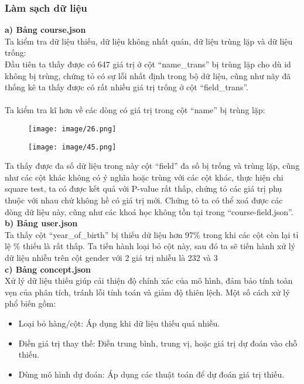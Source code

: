 \subsubsection{Làm sạch dữ liệu}
\textbf{a) Bảng course.json}\\
Ta kiểm tra dữ liệu thiếu, dữ liệu không nhất quán, dữ liệu trùng lặp và dữ liệu trống:
\\
Đầu tiên ta thấy được có 647 giá trị ở cột “name\_trans” bị trùng lặp cho dù id không bị trùng, chứng tỏ có sự lỗi nhất định trong bộ dữ liệu, cũng như nãy đã thống kê ta thấy được có rất nhiều giá trị trống ở cột “field\_trans”.\\
\\
Ta kiểm tra kĩ hơn về các dòng có giá trị trong cột “name” bị trùng lặp:
\begin{figure}[h]
    \centering
    \texttt{[image: image/26.png]}
\end{figure}
\newpage
\begin{figure}
    \centering
    \texttt{[image: image/45.png]}
\end{figure}
Ta thấy được đa số dữ liệu trong này cột “field” đa số bị trống và trùng lặp, cũng như các cột khác không có ý nghĩa hoặc trùng với các cột khác, thực hiện chi square test, ta có được kết quả với P-value rất thấp, chứng tỏ các giá trị phụ thuộc với nhau chứ không hề có giá trị mới. Chứng tỏ ta có thể xoá được các dòng dữ liệu này, cũng như các khoá học không tồn tại trong “course-field.json”.\\
\textbf{b) Bảng user.json}\\
Ta thấy cột “year\_of\_birth” bị thiếu dữ liệu hơn 97\% trong khi các cột còn lại tỉ lệ \% thiếu là rất thấp. Ta tiến hành loại bỏ cột này, sau đó ta sẽ tiến hành xử lý dữ liệu nhiễu trên cột gender với 2 giá trị nhiễu là 232 và 3\\
\textbf{c) Bảng concept.json}\\
Xử lý dữ liệu thiếu giúp cải thiện độ chính xác của mô hình, đảm bảo tính toàn vẹn của phân tích, tránh lỗi tính toán và giảm độ thiên lệch. Một số cách xử lý phổ biến gồm:\\
\begin{itemize}
    \item Loại bỏ hàng/cột: Áp dụng khi dữ liệu thiếu quá nhiều.
    \item Điền giá trị thay thế: Điền trung bình, trung vị, hoặc giá trị dự đoán vào chỗ thiếu.
    \item Dùng mô hình dự đoán: Áp dụng các thuật toán để dự đoán giá trị thiếu.
\end{itemize}
